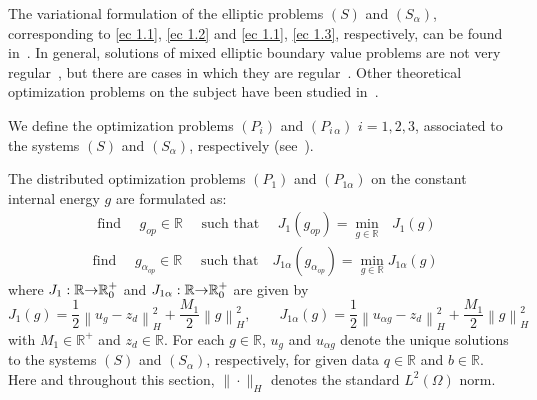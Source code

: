 \documentclass[11pt]{article}
\begin{document}
  
The variational formulation of the  elliptic problems {$(S)$ and $(S_\alpha)$, corresponding to} \eqref{ec 1.1}, \eqref{ec 1.2} and \eqref{ec 1.1}, \eqref{ec 1.3}, {respectively,} can be found  in~\cite{GaTa2003,GaTa2008,TaTa1989}. In general,  solutions of mixed elliptic boundary value problems {are not very} regular~\cite{Gr1985}, but there are cases in which they are regular~\cite{AzKr1982,LaCaBr2008,Sh1968}. Other theoretical optimization problems on the subject have been {studied} in~\cite{Hi2005,WaWa2011}. 
 
We define the optimization problems $(P_i)$ and $(P_{i\,\alpha})$ $i=1,2,3$, associated to the systems $(S)$ and $(S_\alpha)$, respectively (see~\cite{Ba1984,GaTa2003,Li1968,NeSpTi2006,Tr2010}). 

The distributed optimization problems $(P_1)$ and $(P_{1\alpha})$ on the constant internal energy $g$ are formulated as:
\begingroup
\addtolength{\jot}{0.5em}
\begin{align}
& \text{ find }\quad g_{op}\in \mathbb{R}\quad\text{ such that }\quad
J_{1}(g_{op})=\min\limits_{g\in \mathbb{R}} \text{ }J_{1}(g)
\label{PControlJ1} \\
& \text{find }\quad g_{{\alpha}_{op}}\in \mathbb{R}\quad\text{ such that
}\quad J_{1\alpha}(g_{{\alpha}_{op}})=\min\limits_{g\in \mathbb{R}} \text{
}J_{1\alpha}(g)  \label{PControlalfaJ1}
\end{align}
\endgroup
where $J_{1}:\mathbb{R}{\rightarrow}{\Bbb R}_{0}^{+}$ and
$J_{1\alpha}:\mathbb{R}{\rightarrow}{\Bbb R}_{0}^{+}$ are given by
\begin{equation} \label{J1-J1alpha}
J_{1}(g)=\frac{1}{2}\left\|u_{g}-z_{d}\right\|
_{H}^{2}+\frac{M_{1}}{2}\left\| g\right\|_{H}^{2},\qquad J_{1\alpha}(g)=\frac{1}{2}\left\|u_{\alpha
g}-z_{d}\right\| _{H}^{2}+\frac{M_{1}}{2}\left\| g\right\|_{H}^{2}
\end{equation}
with $M_{1}\in\mathbb{R}^+$ and $z_{d}\in \mathbb{R}$. { For each $g \in \mathbb{R}$, $u_g$ and $u_{\alpha g}$ denote the unique solutions to the systems $(S)$ and $(S_\alpha)$, respectively, for given data $q \in \mathbb{R}$ and $b \in \mathbb{R}$.  }
{ Here and throughout this section, $\|\cdot\|_H$ denotes the standard $L^2(\Omega)$ norm.}
\end{document}
